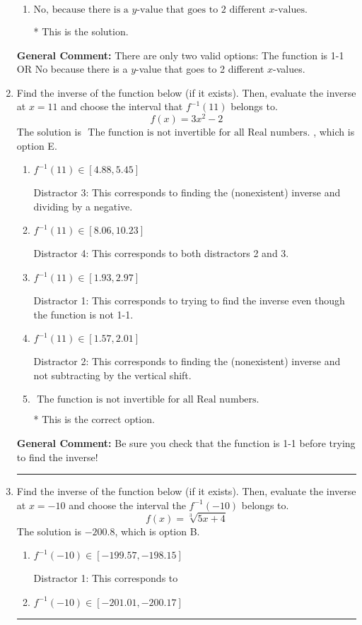 \documentclass{extbook}[14pt]
\newcommand{\litem}[1]{\item #1

\rule{\textwidth}{0.4pt}}
\begin{document}
\begin{enumerate}
{\begin{enumerate}[label=\Alph*.]
Corresponds to believing 1-1 means the domain is all Real numbers.
\item \( \text{No, because there is a $y$-value that goes to 2 different $x$-values.} \)

* This is the solution.
\end{enumerate}

\textbf{General Comment:} There are only two valid options: The function is 1-1 OR No because there is a $y$-value that goes to 2 different $x$-values.
}
\litem{
Find the inverse of the function below (if it exists). Then, evaluate the inverse at $x = 11$ and choose the interval that $f^{-1}(11)$ belongs to.
\[ f(x) = 3 x^2 - 2 \]The solution is \( \text{ The function is not invertible for all Real numbers. } \), which is option E.\begin{enumerate}[label=\Alph*.]
\item \( f^{-1}(11) \in [4.88, 5.45] \)

 Distractor 3: This corresponds to finding the (nonexistent) inverse and dividing by a negative.
\item \( f^{-1}(11) \in [8.06, 10.23] \)

 Distractor 4: This corresponds to both distractors 2 and 3.
\item \( f^{-1}(11) \in [1.93, 2.97] \)

 Distractor 1: This corresponds to trying to find the inverse even though the function is not 1-1. 
\item \( f^{-1}(11) \in [1.57, 2.01] \)

 Distractor 2: This corresponds to finding the (nonexistent) inverse and not subtracting by the vertical shift.
\item \( \text{ The function is not invertible for all Real numbers. } \)

* This is the correct option.
\end{enumerate}

\textbf{General Comment:} Be sure you check that the function is 1-1 before trying to find the inverse!
}
\litem{
Find the inverse of the function below (if it exists). Then, evaluate the inverse at $x = -10$ and choose the interval the $f^{-1}(-10)$ belongs to.
\[ f(x) = \sqrt[3]{5 x + 4} \]The solution is \( -200.8 \), which is option B.\begin{enumerate}[label=\Alph*.]
\item \( f^{-1}(-10) \in [-199.57, -198.15] \)

 Distractor 1: This corresponds to 
\item \( f^{-1}(-10) \in [-201.01, -200.17] \)


\end{enumerate}}
\end{enumerate}
\end{document}
